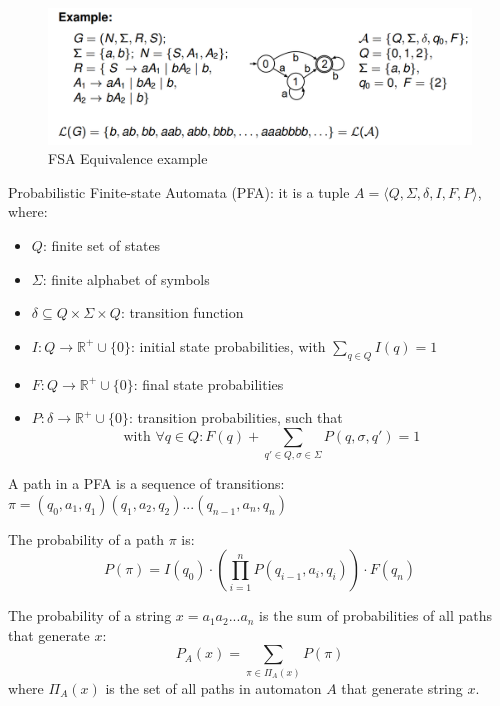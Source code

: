 \begin{figure}[htbp]
   \centering
   \includegraphics{images/07/fsaEquivalence.png}
   \caption{FSA Equivalence example}
   \label{fig:07/fsaEquivalence}
\end{figure}

Probabilistic Finite-state Automata (PFA): it is a tuple
$A = \langle Q, \Sigma, \delta, I, F , P\rangle $, where:


\begin{itemize}
   \item $Q$: finite set of states
   \item $\Sigma$: finite alphabet of symbols
   \item $\delta \subseteq Q \times \Sigma \times Q$: transition function
   \item $I: Q \rightarrow \mathbb{R}^+ \cup \{0\}$: initial state probabilities, with $\sum_{q \in Q} I(q) = 1$
   \item $F: Q \rightarrow \mathbb{R}^+ \cup \{0\}$: final state probabilities
   \item $P: \delta \rightarrow \mathbb{R}^+ \cup \{0\}$: transition probabilities,  such that
   \begin{equation}
      \text{with } \forall q \in Q: F(q) + \sum_{q' \in Q, \sigma \in \Sigma} P(q,\sigma,q') = 1
   \end{equation}
\end{itemize}

A path in a PFA is a sequence of transitions: $\pi = (q_0, a_1, q_1)(q_1, a_2, q_2)...(q_{n-1}, a_n, q_n)$

The probability of a path $\pi$ is:
\begin{equation}
P(\pi) = I(q_0) \cdot \left(\prod_{i=1}^{n} P(q_{i-1}, a_i, q_i)\right) \cdot F(q_n)
\end{equation}

The probability of a string $x = a_1a_2...a_n$ is the sum of probabilities of all paths that generate $x$:
\begin{equation}
P_A(x) = \sum_{\pi \in \Pi_A(x)} P(\pi)
\end{equation}
where $\Pi_A(x)$ is the set of all paths in automaton $A$ that generate string $x$.

